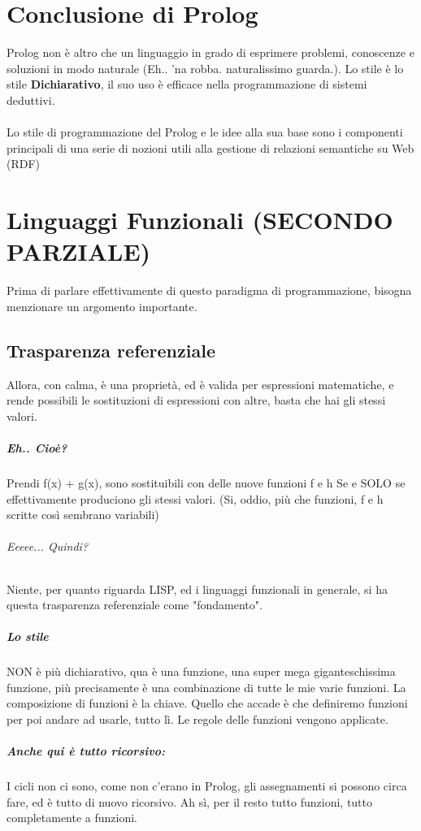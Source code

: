 \documentclass[12pt, a4paper, openany, oneside]{book}
\begin{document}
\chapter*{Conclusione di Prolog}
Prolog non è altro che un linguaggio in grado di esprimere problemi, conoscenze
e soluzioni in modo naturale (Eh.. 'na robba. naturalissimo guarda.). Lo stile
è lo stile \textbf{Dichiarativo}, il suo uso è efficace nella programmazione di 
sistemi deduttivi.\\ \\
Lo stile di programmazione del Prolog e le idee alla sua base sono i componenti 
principali di una serie di nozioni utili alla gestione di relazioni semantiche
su Web (RDF)
\chapter{Linguaggi Funzionali (SECONDO PARZIALE)}
Prima di parlare effettivamente di questo paradigma di programmazione, bisogna 
menzionare un argomento importante.
\section{Trasparenza referenziale}
Allora, con calma, è una proprietà, ed è valida per espressioni 
matematiche, e rende possibili le sostituzioni di espressioni con altre, basta 
che hai gli stessi valori. 
\paragraph{Eh.. Cioè? }Prendi f(x) + g(x), sono sostituibili con delle nuove
funzioni f e h Se e SOLO se effettivamente produciono gli stessi valori. (Si, 
oddio, più che funzioni, f e h scritte così sembrano variabili)
\subparagraph{Eeeee... Quindi?} Niente, per quanto riguarda LISP, ed i linguaggi
funzionali in generale, si ha questa trasparenza referenziale come "fondamento".
\paragraph{Lo stile }NON è più dichiarativo, qua è una funzione, una super mega 
giganteschissima funzione, più precisamente è una combinazione di tutte le mie 
varie funzioni. La composizione di funzioni è la chiave.
Quello che accade è che definiremo funzioni per poi andare ad usarle, 
tutto lì. Le regole delle funzioni vengono applicate.
\paragraph{Anche qui è tutto ricorsivo: }I cicli non ci sono, come non c'erano
in Prolog, gli assegnamenti si possono circa fare, ed è tutto di nuovo 
ricorsivo. Ah sì, per il resto tutto funzioni, tutto completamente a funzioni.
\end{document}
